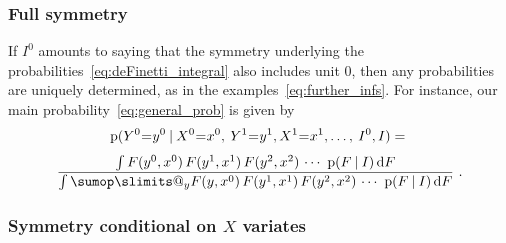 \documentclass[a4paper,12pt,%
onecolumn,oneside,article,%
british%
]{memoir}
\makeatletter
\def\sum{\DOTSI\sumop\slimits@}
\newcommand*{\di}{\mathop{}\!\mathrm{d}}%
\newcommand*{\p}{\mathrm{p}}%
\renewcommand*{\|}[1][]{\nonscript\:#1\vert\nonscript\:\mathopen{}}
\newcommand*{\mo}[1][=]{\mathclose{}\mathord{\nonscript\mkern0.5mu#1\nonscript\mkern0.5mu}\mathopen{}}
\newcommand*{\Iyx}{I}
\makeatother
\begin{document}
\subsubsection{Full symmetry}
\label{sec:unit0_full}

If $\Iyx^{0}$ amounts to saying that the symmetry underlying the probabilities~\eqref{eq:deFinetti_integral} also includes unit $0$, then any probabilities are uniquely determined, as in the examples~\eqref{eq:further_infs}. For instance, our main probability~\eqref{eq:general_prob} is given by
\begin{multline}
  \label{eq:general_prob_fullexch}
  \p(Y^{0}\mo y^{0} \|
  X^{0}\mo x^{0},\: Y^{1}\mo y^{1},X^{1}\mo x^{1},\dotsc,\: \Iyx^{0},I)
  =
{}\\[\jot]
  \frac{
    \int F(y^{0},x^{0})\, F(y^{1},x^{1})\, F(y^{2},x^{2})\,\dotsm\  \p(F  \|I) \di F
  }{
    \int \sum_{y}F(y,x^{0})\, F(y^{1},x^{1})\, F(y^{2},x^{2})\,\dotsm\  \p(F  \|I) \di F
  } \ .
\end{multline}

\subsubsection{Symmetry conditional on $X$ variates}
\label{sec:unit0_condX}
\end{document}
